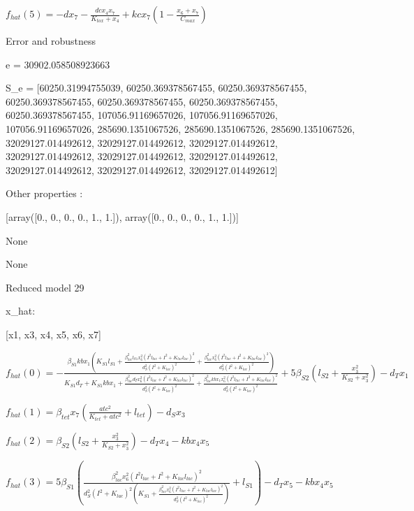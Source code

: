 $f_{hat}(5)=- d x_{7} - \frac{dc x_{4} x_{7}}{K_{tox} + x_{4}} + kc x_{7} \left(1 - \frac{x_{6} + x_{7}}{C_{max}}\right)$



Error and robustness 


e = 30902.058508923663

S_e = [60250.31994755039, 60250.369378567455, 60250.369378567455, 60250.369378567455, 60250.369378567455, 60250.369378567455, 60250.369378567455, 107056.91169657026, 107056.91169657026, 107056.91169657026, 285690.1351067526, 285690.1351067526, 285690.1351067526, 32029127.014492612, 32029127.014492612, 32029127.014492612, 32029127.014492612, 32029127.014492612, 32029127.014492612, 32029127.014492612, 32029127.014492612, 32029127.014492612]

Other properties :


[array([0., 0., 0., 0., 1., 1.]), array([0., 0., 0., 0., 1., 1.])]

None

None

Reduced model 29

x_{hat}: 

[x1, x3, x4, x5, x6, x7]


$f_{hat}(0)=- \frac{\beta_{S1} kb x_{1} \left(K_{S1} l_{S1} + \frac{\beta_{lac}^{2} l_{S1} x_{6}^{2} \left(I^{2} l_{lac} + I^{2} + K_{lac} l_{lac}\right)^{2}}{d_{S}^{2} \left(I^{2} + K_{lac}\right)^{2}} + \frac{\beta_{lac}^{2} x_{6}^{2} \left(I^{2} l_{lac} + I^{2} + K_{lac} l_{lac}\right)^{2}}{d_{S}^{2} \left(I^{2} + K_{lac}\right)^{2}}\right)}{K_{S1} d_{T} + K_{S1} kb x_{1} + \frac{\beta_{lac}^{2} d_{T} x_{6}^{2} \left(I^{2} l_{lac} + I^{2} + K_{lac} l_{lac}\right)^{2}}{d_{S}^{2} \left(I^{2} + K_{lac}\right)^{2}} + \frac{\beta_{lac}^{2} kb x_{1} x_{6}^{2} \left(I^{2} l_{lac} + I^{2} + K_{lac} l_{lac}\right)^{2}}{d_{S}^{2} \left(I^{2} + K_{lac}\right)^{2}}} + 5 \beta_{S2} \left(l_{S2} + \frac{x_{3}^{2}}{K_{S2} + x_{3}^{2}}\right) - d_{T} x_{1}$


$f_{hat}(1)=\beta_{tet} x_{7} \left(\frac{atc^{2}}{K_{tet} + atc^{2}} + l_{tet}\right) - d_{S} x_{3}$


$f_{hat}(2)=\beta_{S2} \left(l_{S2} + \frac{x_{3}^{2}}{K_{S2} + x_{3}^{2}}\right) - d_{T} x_{4} - kb x_{4} x_{5}$


$f_{hat}(3)=5 \beta_{S1} \left(\frac{\beta_{lac}^{2} x_{6}^{2} \left(I^{2} l_{lac} + I^{2} + K_{lac} l_{lac}\right)^{2}}{d_{S}^{2} \left(I^{2} + K_{lac}\right)^{2} \left(K_{S1} + \frac{\beta_{lac}^{2} x_{6}^{2} \left(I^{2} l_{lac} + I^{2} + K_{lac} l_{lac}\right)^{2}}{d_{S}^{2} \left(I^{2} + K_{lac}\right)^{2}}\right)} + l_{S1}\right) - d_{T} x_{5} - kb x_{4} x_{5}$


